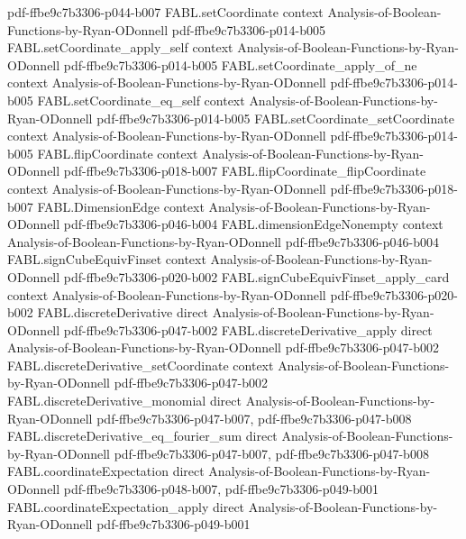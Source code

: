 \begin{theorem}
  {pdf-ffbe9c7b3306-p044-b007}
\proofstep
  {FABL.setCoordinate}
  {context}
  {Analysis-of-Boolean-Functions-by-Ryan-ODonnell}
  {pdf-ffbe9c7b3306-p014-b005}
\proofstep
  {FABL.setCoordinate_apply_self}
  {context}
  {Analysis-of-Boolean-Functions-by-Ryan-ODonnell}
  {pdf-ffbe9c7b3306-p014-b005}
\proofstep
  {FABL.setCoordinate_apply_of_ne}
  {context}
  {Analysis-of-Boolean-Functions-by-Ryan-ODonnell}
  {pdf-ffbe9c7b3306-p014-b005}
\proofstep
  {FABL.setCoordinate_eq_self}
  {context}
  {Analysis-of-Boolean-Functions-by-Ryan-ODonnell}
  {pdf-ffbe9c7b3306-p014-b005}
\proofstep
  {FABL.setCoordinate_setCoordinate}
  {context}
  {Analysis-of-Boolean-Functions-by-Ryan-ODonnell}
  {pdf-ffbe9c7b3306-p014-b005}
\proofstep
  {FABL.flipCoordinate}
  {context}
  {Analysis-of-Boolean-Functions-by-Ryan-ODonnell}
  {pdf-ffbe9c7b3306-p018-b007}
\proofstep
  {FABL.flipCoordinate_flipCoordinate}
  {context}
  {Analysis-of-Boolean-Functions-by-Ryan-ODonnell}
  {pdf-ffbe9c7b3306-p018-b007}
\proofstep
  {FABL.DimensionEdge}
  {context}
  {Analysis-of-Boolean-Functions-by-Ryan-ODonnell}
  {pdf-ffbe9c7b3306-p046-b004}
\proofstep
  {FABL.dimensionEdgeNonempty}
  {context}
  {Analysis-of-Boolean-Functions-by-Ryan-ODonnell}
  {pdf-ffbe9c7b3306-p046-b004}
\proofstep
  {FABL.signCubeEquivFinset}
  {context}
  {Analysis-of-Boolean-Functions-by-Ryan-ODonnell}
  {pdf-ffbe9c7b3306-p020-b002}
\proofstep
  {FABL.signCubeEquivFinset_apply_card}
  {context}
  {Analysis-of-Boolean-Functions-by-Ryan-ODonnell}
  {pdf-ffbe9c7b3306-p020-b002}
\proofstep
  {FABL.discreteDerivative}
  {direct}
  {Analysis-of-Boolean-Functions-by-Ryan-ODonnell}
  {pdf-ffbe9c7b3306-p047-b002}
\proofstep
  {FABL.discreteDerivative_apply}
  {direct}
  {Analysis-of-Boolean-Functions-by-Ryan-ODonnell}
  {pdf-ffbe9c7b3306-p047-b002}
\proofstep
  {FABL.discreteDerivative_setCoordinate}
  {context}
  {Analysis-of-Boolean-Functions-by-Ryan-ODonnell}
  {pdf-ffbe9c7b3306-p047-b002}
\proofstep
  {FABL.discreteDerivative_monomial}
  {direct}
  {Analysis-of-Boolean-Functions-by-Ryan-ODonnell}
  {pdf-ffbe9c7b3306-p047-b007,
    pdf-ffbe9c7b3306-p047-b008}
\proofstep
  {FABL.discreteDerivative_eq_fourier_sum}
  {direct}
  {Analysis-of-Boolean-Functions-by-Ryan-ODonnell}
  {pdf-ffbe9c7b3306-p047-b007,
    pdf-ffbe9c7b3306-p047-b008}
\proofstep
  {FABL.coordinateExpectation}
  {direct}
  {Analysis-of-Boolean-Functions-by-Ryan-ODonnell}
  {pdf-ffbe9c7b3306-p048-b007,
    pdf-ffbe9c7b3306-p049-b001}
\proofstep
  {FABL.coordinateExpectation_apply}
  {direct}
  {Analysis-of-Boolean-Functions-by-Ryan-ODonnell}
  {pdf-ffbe9c7b3306-p049-b001}

\end{theorem}
